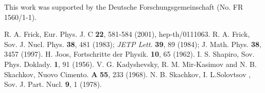 \documentclass[a4paper,12pt]{article}
\begin{document}
This work was supported by the Deutsche Forschungsgemeinschaft (No. FR 1560/1-1).
\begin{thebibliography}{99}
R. A. Frick,  Eur. Phys. J. C {\bf 22}, 581-584 (2001), hep-th/0111063.
 R. A. Frick,  Sov. J. Nucl. Phys. {\bf 38}, 481 (1983); {\it JETP Lett.} {\bf 39}, 89 (1984);  J. Math. Phys. {\bf 38}, 3457 (1997).
H. Joos,  Fortschritte der Physik. {\bf 10}, 65 (1962).
I. S. Shapiro, Sov. Phys. Doklady. {\bf 1}, 91 (1956).
V. G. Kadyshevsky, R. M. Mir-Kasimov  and N. B. Skachkov,  Nuovo Cimento. {\bf A} {\bf 55}, 233 (1968).
N. B. Skachkov, I. L.Solovtsov ,  Sov. J. Part. Nucl. {\bf 9}, 1 (1978).
\end{thebibliography}
\end{document}
